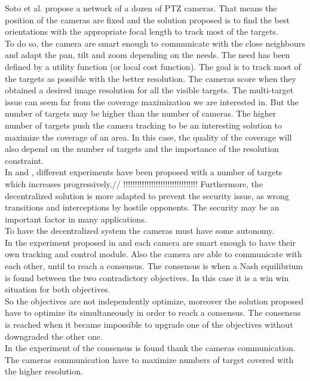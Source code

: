 Soto et al. \cite{12*soto2009} propose a network of a dozen of PTZ cameras. That means the position of the cameras are fixed and the solution proposed is to find the best orientations with the appropriate focal length to track most of the targets.  \\
 To do so, the camera are smart enough to communicate with the close neighbours and adapt the pan, tilt and zoom depending on the needs.
The need has been defined by a utility function (or local cost function). The goal is to track most of the targets as possible with the better resolution. The cameras score when they obtained a desired image resolution for all the visible targets.
 The multi-target issue can seem far from the coverage maximization we are interested in. But the number of targets may be higher than the number of cameras. The higher number of targets push the camera tracking to be an interesting solution to maximize the coverage of an area. In this case, the quality of the coverage will also depend on the number of targets and the importance of the resolution constraint.  \\
	 In \cite{18*ding2012} and \cite{25*song2008}, different experiments have been proposed with a number of targets which increases progressively.//
!!!!!!!!!!!!!!!!!!!!!!!!!!!!!!!!
	  Furthermore, the decentralized solution is more adapted to prevent the security issue, as wrong transitions and interceptions by hostile opponents. The security may be an important factor in many applications. \\
To have the decentralized system the cameras must have some autonomy. \\
In the experiment proposed in \cite{12*soto2009} and \cite{18*ding2012,25*song2008} each camera are smart enough to have their own tracking and control module. Also the camera are able to communicate with each other, until to reach a consensus. The consensus is when a Nash equilibrium is found between the two contradictory objectives. In this case it is a win win situation for both objectives.\\
So the objectives are not independently optimize, moreover the solution proposed have to optimize its  simultaneously in order to reach a consensus. The consensus is reached when it became impossible to upgrade one of the objectives without downgraded the other one.\\
  In the experiment of \cite{18*ding2012,25*song2008} the consensus is found thank the cameras communication. The cameras communication have to maximize numbers of  target covered with the higher resolution.
